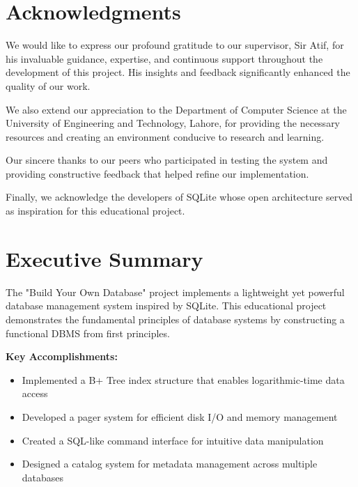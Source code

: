 \documentclass[12pt,a4paper]{article}  %
\newenvironment{highlight}{%
  \begin{tcolorbox}[
    colback=lightgray,
    colframe=uetblue,
    boxrule=0.5pt,
    arc=2mm,
    beforeafter skip=12pt,
    width=\textwidth,
    enlarge left by=-2mm,
    enlarge right by=-2mm
  ]
}{%
  \end{tcolorbox}
}
\begin{document}
\section*{Acknowledgments}

We would like to express our profound gratitude to our supervisor, Sir Atif, for his invaluable guidance, expertise, and continuous support throughout the development of this project. His insights and feedback significantly enhanced the quality of our work.

We also extend our appreciation to the Department of Computer Science at the University of Engineering and Technology, Lahore, for providing the necessary resources and creating an environment conducive to research and learning.

Our sincere thanks to our peers who participated in testing the system and providing constructive feedback that helped refine our implementation.

Finally, we acknowledge the developers of SQLite whose open architecture served as inspiration for this educational project.

\clearpage

\renewcommand{\contentsname}{\textcolor{uetblue}{\large\bfseries Contents}}
\tableofcontents

\renewcommand{\listfigurename}{\textcolor{uetblue}{\large\bfseries List of Figures}}
\listoffigures
\renewcommand{\listtablename}{\textcolor{uetblue}{\large\bfseries List of Tables}}
\listoftables
\clearpage


\section*{Executive Summary}

The "Build Your Own Database" project implements a lightweight yet powerful database management system inspired by SQLite. This educational project demonstrates the fundamental principles of database systems by constructing a functional DBMS from first principles.

\begin{highlight}
\textbf{Key Accomplishments:}
\begin{itemize}
    \item Implemented a B+ Tree index structure that enables logarithmic-time data access
    \item Developed a pager system for efficient disk I/O and memory management
    \item Created a SQL-like command interface for intuitive data manipulation
    \item Designed a catalog system for metadata management across multiple databases
\end{itemize}
\end{highlight}
\end{document}

